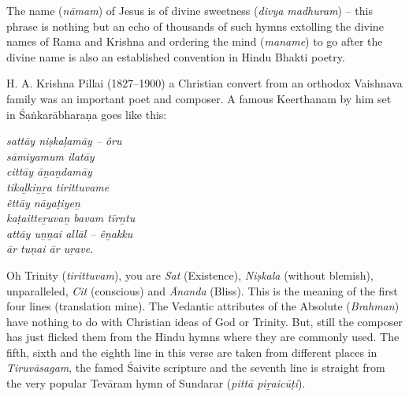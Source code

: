The name (\textit{nāmam}) of Jesus is of divine sweetness (\textit{divya madhuram}) – this phrase is nothing but an echo of thousands of such hymns extolling the divine names of Rama and Krishna and ordering the mind (\textit{maname}) to go after the divine name is also an established convention in Hindu Bhakti poetry.

\newpage

H. A. Krishna Pillai (1827–1900) a Christian convert from an orthodox Vaishnava family was an important poet and composer. A famous Keerthanam by him set in Śaṅkarābharaṇa goes like this:

\begin{myquote}
\textit{sattāy niṣkaḷamāy – ôru\\ sāmiyamum ilatāy \\ cittāy āṉaṉdamāy\\ tikaḻkiṉṟa tirittuvame\\ êttāy nāyaṭiyeṉ\\ kaṭaitteṟuvaṉ bavam tīrṉtu\\ attāy uṉṉai allāl – êṉakku\\ ār tuṇai ār uṟave.}
\end{myquote}

\begin{myquote}
\end{myquote}

Oh Trinity (\textit{tirittuvam}), you are \textit{Sat} (Existence), \textit{Niṣkala} (without blemish), unparalleled, \textit{Cit} (conscious) and \textit{Ānanda} (Bliss). This is the meaning of the first four lines (translation mine). The Vedantic attributes of the Absolute (\textit{Brahman}) have nothing to do with Christian ideas of God or Trinity. But, still the composer has just flicked them from the Hindu hymns where they are commonly used. The fifth, sixth and the eighth line in this verse are taken from different places in \textit{Tiruvāsagam}, the famed Śaivite scripture and the seventh line is straight from the very popular Tevāram hymn of Sundarar (\textit{pittā piṟaicūṭi}).

